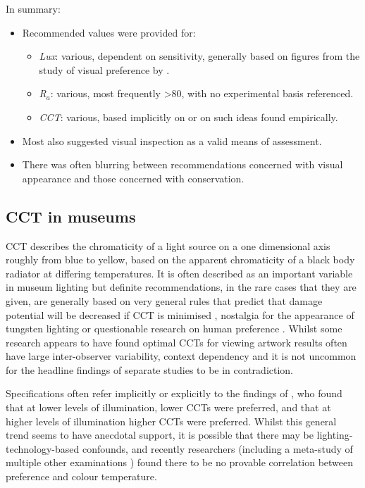 \noindent
In summary:
\begin{itemize}
\item Recommended values were provided for:
\begin{itemize}
\item \emph{Lux}: various, dependent on sensitivity, generally based on figures from the study of visual preference by \citet{loe_preferred_1982}.
\item \emph{R$_a$}: various, most frequently \textgreater 80, with no experimental basis referenced.
\item \emph{\gls{CCT}}: various, based implicitly on \citet{kruithof_tubular_1941} or on such ideas found empirically.
\end{itemize}
\item Most also suggested visual inspection as a valid means of assessment.
\item There was often blurring between recommendations concerned with visual appearance and those concerned with conservation. 
\end{itemize}

\subsection{CCT in museums}

\acrfull{CCT} describes the chromaticity of a light source on a one dimensional axis roughly from blue to yellow, based on the apparent chromaticity of a black body radiator at differing temperatures. It is often described as an important variable in museum lighting but definite recommendations, in the rare cases that they are given, are generally based on very general rules that predict that damage potential will be decreased if \gls{CCT} is minimised \citep{cie_cie_2004}, nostalgia for the appearance of tungsten lighting or questionable research on human preference \citep{kruithof_tubular_1941,fotios_revised_2017}. Whilst some research appears to have found optimal \glspl{CCT} for viewing artwork \citep{nascimento_best_2014,pinto_correlated_2008,scuello_museum_2004,scuello_museum_2004-1, liu_cultural_2013} results often have large inter-observer variability, context dependency and it is not uncommon for the headline findings of separate studies to be in contradiction. 

Specifications often refer implicitly or explicitly to the findings of \citet{kruithof_tubular_1941}, who found that at lower levels of illumination, lower \glspl{CCT} were preferred, and that at higher levels of illumination higher \glspl{CCT} were preferred. Whilst this general trend seems to have anecdotal support, it is possible that there may be lighting-technology-based confounds, and recently researchers \citep{vienot_kruithofs_2009} (including a meta-study of multiple other examinations \citep{fotios_revised_2017}) found there to be no provable correlation between preference and colour temperature.

